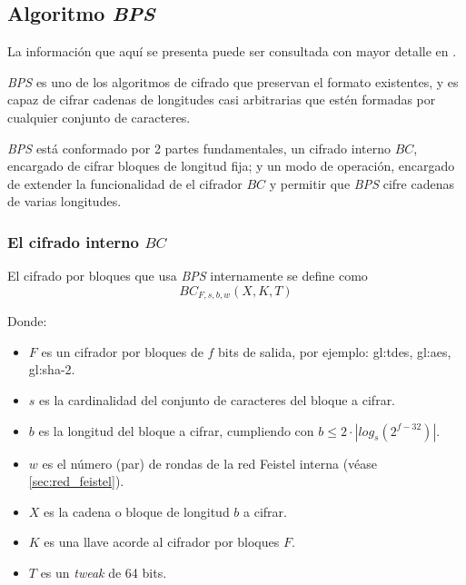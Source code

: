 %
%

\subsection{Algoritmo \textit{BPS}}
\label{sec:bps}

La información que aquí se presenta puede ser consultada con mayor detalle en
\cite{bps}.

\textit{BPS} es uno de los algoritmos de cifrado que preservan el formato
existentes, y es capaz de cifrar cadenas de longitudes casi arbitrarias que
estén formadas por cualquier conjunto de caracteres.

\textit{BPS} está conformado por 2 partes fundamentales, un cifrado interno
$BC$, encargado de cifrar bloques de longitud fija; y un modo de operación,
encargado de extender la funcionalidad de el cifrador $BC$ y permitir que
\textit{BPS} cifre cadenas de varias longitudes.


\subsubsection{El cifrado interno $BC$}
\label{sec:bps_cifrador_interno_bc}


El cifrado por bloques que usa \textit{BPS} internamente se define como
\begin{equation}
  BC_{F,s,b,w}(X,K,T)
\end{equation}

Donde:
\begin{itemize}
  \item $F$ es un cifrador por bloques de $f$ bits de salida,
    por ejemplo: \gls{gl:tdes}, \gls{gl:aes}, \gls{gl:sha}-2.
  \item $s$ es la cardinalidad del conjunto de caracteres del bloque a cifrar.
  \item $b$ es la longitud del bloque a cifrar,
    cumpliendo con $b \leq 2 \cdot |log_s(2^{f-32})|$.
  \item $w$ es el número (par) de rondas de la red Feistel interna
    (véase \ref{sec:red_feistel}).
  \item $X$ es la cadena o bloque de longitud $b$ a cifrar.
  \item $K$ es una llave acorde al cifrador por bloques $F$.
  \item $T$ es un \textit{tweak} de 64 bits.
\end{itemize}

